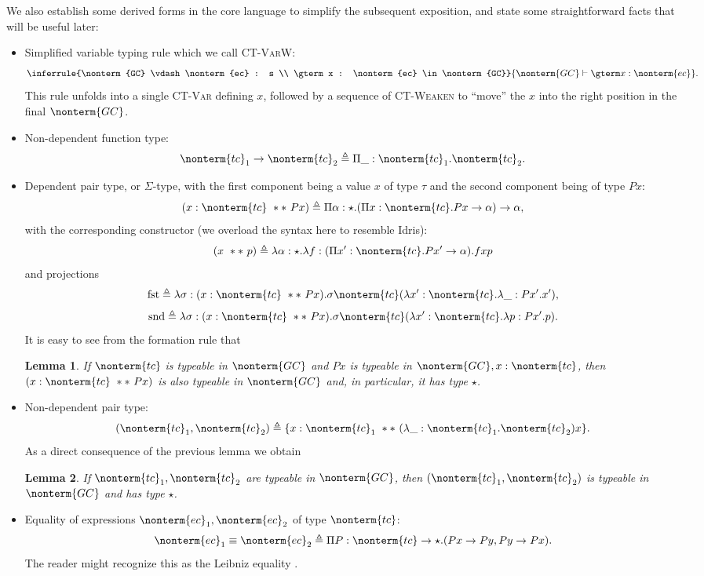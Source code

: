 \documentclass[a4paper]{article}
\newtheorem{lemma}{Lemma}
\begin{document}
We also establish some derived forms in the core language to simplify the subsequent exposition,
and state some straightforward facts that will be useful later:
\begin{itemize}
  \item Simplified variable typing rule which we call \textsc{CT-VarW}:
    \[
      \inferrule{\nonterm{GC} \vdash \nonterm{ec} : s \\ \gterm x : \nonterm{ec} \in \nonterm{GC}}
                {\nonterm{GC} \vdash \gterm x : \nonterm{ec}}.
    \]
    This rule unfolds into a single \textsc{CT-Var} defining $x$,
    followed by a sequence of \textsc{CT-Weaken}
    to ``move'' the $x$ into the right position in the final $\nonterm{GC}$.
  \item Non-dependent function type:
    \[
      \nonterm{tc}_1 \rightarrow \nonterm{tc}_2 \triangleq \Pi \_ : \nonterm{tc}_1. \nonterm{tc}_2.
    \]
  \item Dependent pair type, or $\Sigma$-type, with the first component being a value $x$ of type $\tau$ and the second component being of type $P x$:
    \[
      (x : \nonterm{tc} \dast P x) \triangleq \Pi \alpha : \star. (\Pi x : \nonterm{tc}. P x \rightarrow \alpha) \rightarrow \alpha,
    \]
    with the corresponding constructor (we overload the syntax here to resemble Idris):
    \[
      (x \dast p) \triangleq \lambda \alpha : \star. \lambda f : (\Pi x' : \nonterm{tc}. P x' \rightarrow \alpha). f x p
    \]
    and projections
    \[
      \text{fst} \triangleq \lambda \sigma : (x : \nonterm{tc} \dast P x). \sigma \nonterm{tc} (\lambda x' : \nonterm{tc}. \lambda \_ : P x'. x'),
    \]
    \[
      \text{snd} \triangleq \lambda \sigma : (x : \nonterm{tc} \dast P x). \sigma \nonterm{tc} (\lambda x' : \nonterm{tc}. \lambda p : P x'. p).
    \]
    It is easy to see from the formation rule that
    \begin{lemma}\label{lma:dep_pair_typing}
      If $\nonterm{tc}$ is typeable in $\nonterm{GC}$
      and $P x$ is typeable in $\nonterm{GC} , x : \nonterm{tc}$,
      then $(x : \nonterm{tc} \dast P x)$ is also typeable in $\nonterm{GC}$ and,
      in particular, it has type $\star$.
    \end{lemma}
  \item Non-dependent pair type:
    \[
      (\nonterm{tc}_1, \nonterm{tc}_2) \triangleq \{ x : \nonterm{tc}_1\ **\ (\lambda \_ : \nonterm{tc}_1. \nonterm{tc}_2) x \}.
    \]
    As a direct consequence of the previous lemma we obtain
    \begin{lemma}\label{lma:non_dep_pair_typing}
      If $\nonterm{tc}_1, \nonterm{tc}_2$ are typeable in $\nonterm{GC}$,
      then $(\nonterm{tc}_1, \nonterm{tc}_2)$ is typeable in $\nonterm{GC}$ and has type $\star$.
    \end{lemma}
  \item Equality of expressions $\nonterm{ec}_1, \nonterm{ec}_2$ of type $\nonterm{tc}$:
    \[
      \nonterm{ec}_1 \equiv \nonterm{ec}_2 \triangleq \Pi P : \nonterm{tc} \rightarrow \star. (P x \rightarrow P y, P y \rightarrow P x).
    \]
    The reader might recognize this as the Leibniz equality \cite{FindSomethingForThis}.


\end{itemize}
\end{document}
